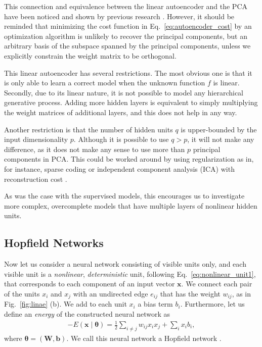 \documentclass[dissertation,nocontribution,draft*]{aaltoseries}
\newcommand{\vect}[1]{\mathbf{#1}}
\newcommand{\vects}[1]{\boldsymbol{#1}}
\newcommand{\matr}[1]{\mathbf{#1}}
\newcommand{\vb}[0]{\vect{b}}
\newcommand{\vx}[0]{\vect{x}}
\newcommand{\mW}[0]{\matr{W}}
\newcommand{\TT}[0]{{\vects{\theta}}}
\begin{document}
This connection and equivalence between the linear
autoencoder and the PCA have been noticed and shown by
previous research \citep[see, for
instance,][]{Oja1982,Baldi1989}. However, it should be
reminded that minimizing the cost function in
Eq.~\eqref{eq:autoencoder_cost} by an optimization
algorithm is unlikely to recover the principal components,
but an arbitrary basis of the subspace spanned by the
principal components, unless we explicitly constrain the
weight matrix to be orthogonal.

This linear autoencoder has several restrictions.  The most
obvious one is that it is only able to learn a correct model
when the unknown function $f$ is linear. 
Secondly, due to its linear nature, it is not possible to
model any hierarchical generative process. Adding more
hidden layers is equivalent to simply multiplying the weight
matrices of additional layers, and this does not help in
any way.

Another restriction is that the number of hidden units $q$
is upper-bounded by the input dimensionality $p$. Although it
is possible to use $q > p$, it will not make any difference,
as it does not make any sense to use more than $p$ principal
components in PCA.  This could be worked around by using
regularization as in, for instance, sparse coding
\citep{Olshausen1996} or independent component analysis
(ICA) with reconstruction cost \citep{Le2011op}. 

As was the case with the supervised models, this encourages
us to investigate more complex, overcomplete models that
have multiple layers of nonlinear hidden units.


\subsection{Hopfield Networks}
\label{sec:hopfield_network}

Now let us consider a neural network consisting of visible
units only, and each visible unit is a \textit{nonlinear},
\textit{deterministic} unit, following
Eq.~\eqref{eq:nonlinear_unit1}, that corresponds to each
component of an input vector $\vx$. We connect each pair of
the units $x_i$ and $x_j$ with an undirected edge $e_{ij}$
that has the weight $w_{ij}$, as in Fig.~\ref{fig:linae} (b).
We add to each unit $x_i$ a bias term $b_i$. Furthermore, let us
define an \textit{energy} of the constructed neural network
as
\begin{align}
    \label{eq:hopfield_energy}
    -E(\vx \mid \TT) = \frac{1}{2} \sum_{i \neq j} w_{ij}
    x_i x_j + \sum_i x_i b_i,
\end{align}
where $\TT = \left( \mW, \vb \right)$.  We call this neural
network a Hopfield network \citep{Hopfield1982}.
\end{document}
